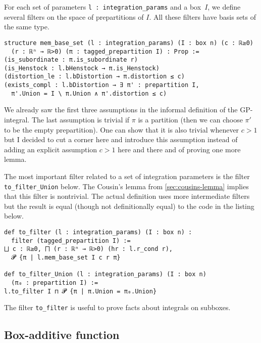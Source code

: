 \documentclass[a4paper,UKenglish,cleveref, autoref, thm-restate]{lipics-v2021}
\begin{document}
For each set of parameters \lstinline=l : integration_params= and a
box~\(I\), we define several filters on the space of prepartitions of
\(I\). All these filters have basis sets of the same type.

\begin{lstlisting}[caption={Basis sets used to define filters related to integration parameters.}]
structure mem_base_set (l : integration_params) (I : box n) (c : ℝ≥0)
  (r : ℝⁿ → ℝ>0) (π : tagged_prepartition I) : Prop :=
(is_subordinate : π.is_subordinate r)
(is_Henstock : l.bHenstock → π.is_Henstock)
(distortion_le : l.bDistortion → π.distortion ≤ c)
(exists_compl : l.bDistortion → ∃ π' : prepartition I,
  π'.Union = I \ π.Union ∧ π'.distortion ≤ c)
\end{lstlisting}

We already saw the first three assumptions in the informal definition
of the GP-integral. The last assumption is trivial if \(\pi\) is a
partition (then we can choose \(\pi'\) to be the empty
prepartition). One can show that it is also trivial whenever \(c>1\)
but I decided to cut a corner here and introduce this assumption
instead of adding an explicit assumption \(c>1\) here and there and of
proving one more lemma.

The most important filter related to a set of integration parameters
is the filter \lstinline=to_filter_Union= below. The Cousin's lemma
from \autoref{sec:cousins-lemma} implies that this filter is
nontrivial. The actual definition uses more intermediate filters but
the result is equal (though not definitionally equal) to the code in
the listing below.

\begin{lstlisting}[caption=Filters defined by a set of integration parameters and a box]
def to_filter (l : integration_params) (I : box n) :
  filter (tagged_prepartition I) :=
⨆ c : ℝ≥0, ⨅ (r : ℝⁿ → ℝ>0) (hr : l.r_cond r),
  𝓟 {π | l.mem_base_set I c r π}

def to_filter_Union (l : integration_params) (I : box n)
  (π₀ : prepartition I) :=
l.to_filter I ⊓ 𝓟 {π | π.Union = π₀.Union}
\end{lstlisting}

The filter \lstinline=to_filter= is useful to prove facts about
integrals on subboxes.

\subsection{Box-additive function}%
\label{sec:box-addit-funct}
\end{document}
